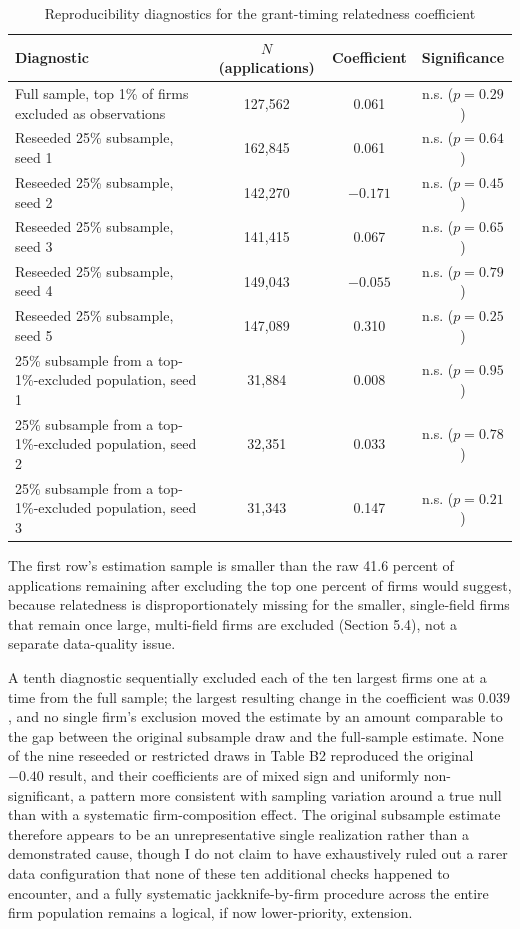 \documentclass[12pt]{article}
\begin{document}
\begin{table}[htbp]
\centering
\small
\caption{Reproducibility diagnostics for the grant-timing relatedness coefficient}
\label{tab:appendixB2}
\begin{tabular}{p{7.5cm}ccc}
\toprule
Diagnostic & $N$ (applications) & Coefficient & Significance \\
\midrule
Full sample, top 1\% of firms excluded as observations & 127{,}562 & 0.061 & n.s. ($p=0.29$) \\
Reseeded 25\% subsample, seed 1 & 162{,}845 & 0.061 & n.s. ($p=0.64$) \\
Reseeded 25\% subsample, seed 2 & 142{,}270 & $-0.171$ & n.s. ($p=0.45$) \\
Reseeded 25\% subsample, seed 3 & 141{,}415 & 0.067 & n.s. ($p=0.65$) \\
Reseeded 25\% subsample, seed 4 & 149{,}043 & $-0.055$ & n.s. ($p=0.79$) \\
Reseeded 25\% subsample, seed 5 & 147{,}089 & 0.310 & n.s. ($p=0.25$) \\
25\% subsample from a top-1\%-excluded population, seed 1 & 31{,}884 & 0.008 & n.s. ($p=0.95$) \\
25\% subsample from a top-1\%-excluded population, seed 2 & 32{,}351 & 0.033 & n.s. ($p=0.78$) \\
25\% subsample from a top-1\%-excluded population, seed 3 & 31{,}343 & 0.147 & n.s. ($p=0.21$) \\
\bottomrule
\end{tabular}
\begin{minipage}{\textwidth}
\vspace{2pt}
\footnotesize The first row's estimation sample is smaller than the raw 41.6 percent of applications remaining after excluding the top one percent of firms would suggest, because relatedness is disproportionately missing for the smaller, single-field firms that remain once large, multi-field firms are excluded (Section 5.4), not a separate data-quality issue.
\end{minipage}
\end{table}

A tenth diagnostic sequentially excluded each of the ten largest firms one at a time from the full sample; the largest resulting change in the coefficient was $0.039$, and no single firm's exclusion moved the estimate by an amount comparable to the gap between the original subsample draw and the full-sample estimate. None of the nine reseeded or restricted draws in Table B2 reproduced the original $-0.40$ result, and their coefficients are of mixed sign and uniformly non-significant, a pattern more consistent with sampling variation around a true null than with a systematic firm-composition effect. The original subsample estimate therefore appears to be an unrepresentative single realization rather than a demonstrated cause, though I do not claim to have exhaustively ruled out a rarer data configuration that none of these ten additional checks happened to encounter, and a fully systematic jackknife-by-firm procedure across the entire firm population remains a logical, if now lower-priority, extension.



\end{document}
